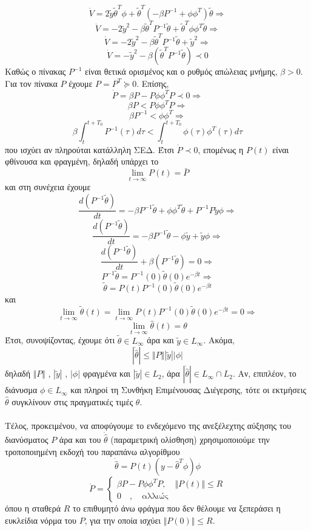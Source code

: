 \documentclass[12pt]{article}
\begin{document}
\[ \dot{V}= 2\tilde{y}\tilde{\theta}^{T}\phi + \tilde{\theta}^{T} \left(  -\beta P^{-1}+\phi \phi^{T} \right)\tilde{\theta} \Rightarrow \]
\[ \dot{V}=- 2\tilde{y}^2 -\beta \tilde{\theta}^{T}P^{-1}\tilde{\theta}+\tilde{\theta}^{T}\phi \phi^{T}\tilde{\theta} \Rightarrow \]
\[ \dot{V}=- 2\tilde{y}^2 -\beta \tilde{\theta}^{T}P^{-1}\tilde{\theta}+\tilde{y}^2\Rightarrow \]
\[ \dot{V}=- \tilde{y}^2 -\beta \left( \tilde{\theta}^{T}P^{-1}\tilde{\theta} \right) \prec 0\]
Καθώς ο πίνακας $P^{-1}$ είναι θετικά ορισμένος και ο ρυθμός απώλειας μνήμης, $\beta > 0$.
Για τον πίνακα $P$ έχουμε $P=P^T \succeq 0$.
Επίσης,
\[\dot{P}=\beta P - P \phi \phi^T P \prec 0 \Rightarrow\]
\[\beta P < P \phi \phi^T P \Rightarrow \]
\[ \beta P^{-1} <  \phi \phi^T \Rightarrow \]
\[\beta \int_{t}^{t+T_0} P^{-1}(\tau) d\tau < \int_{t}^{t+T_0} \phi(\tau) \phi^T(\tau) d\tau\]
που ισχύει αν πληρούται κατάλληλη ΣΕΔ. Έτσι $\dot{P} \prec 0$,
επομένως η $P(t)$ είναι φθίνουσα και φραγμένη, δηλαδή υπάρχει το 
\[\lim_{t \to \infty} P(t) = \bar{P}\]
και στη συνέχεια έχουμε
\[ \frac{d(P^{-1} \tilde{\theta})}{dt} = -\beta P^{-1}\tilde{\theta} + \phi \phi^{T}\tilde{\theta}+P^{-1}P\tilde{y}\phi \Rightarrow \]
\[\frac{d(P^{-1} \tilde{\theta})}{dt} = -\beta P^{-1}\tilde{\theta} -\phi\tilde{y} + \tilde{y}\phi \Rightarrow \]
\[\frac{d(P^{-1} \tilde{\theta})}{dt} + \beta \left( P^{-1}\tilde{\theta} \right) = 0 \Rightarrow \]
\[  P^{-1}\tilde{\theta} =P^{-1}(0)\tilde{\theta}(0) e^{-\beta t} \Rightarrow \]
\[  \tilde{\theta} =P(t)P^{-1}(0)\tilde{\theta}(0) e^{-\beta t}\]
και
\[ \lim_{t \to \infty} \tilde{\theta}(t) =\lim_{t \to \infty} P(t)P^{-1}(0)\tilde{\theta}(0) e^{-\beta t}=0 \Rightarrow\]
\[\lim_{t \to \infty} \hat{\theta}(t) = \theta \]
Έτσι, συνοψίζοντας, έχουμε ότι $\tilde{\theta} \in L_\infty$ άρα και $\tilde{y} \in L_\infty$. Ακόμα, 
\[ | \dot{\hat{\theta}} | \leq \Vert P \Vert |\tilde{y}| |\phi| \]
δηλαδή $\Vert P \Vert$ , $|\tilde{y}|$ , $|\phi|$ φραγμένα και $|\tilde{y}| \in L_2$, άρα $| \dot{\hat{\theta}} | \in L_{\infty} \cap L_2$. Αν, επιπλέον, το διάνυσμα $\phi \in L_{\infty}$ και πληροί τη Συνθήκη Επιμένουσας Διέγερσης, τότε οι εκτμήσεις $\hat{\theta}$ συγκλίνουν στις πραγματικές τιμές $\theta$.
\\ \\
Τέλος, προκειμένου, να αποφύγουμε το ενδεχόμενο της ανεξέλεχτης αύξησης του διανύσματος $P$ άρα και του $\dot{\hat{\theta}}$  (παραμετρική ολίσθηση) χρησιμοποιούμε την τροποποιημένη εκδοχή του παραπάνω αλγορίθμου
\[ \dot{\hat{\theta}}=P(t) \left( y - \hat{\theta}^{T}\phi \right)\phi \]
\[ \dot{P}=
\left\{
                \begin{array}{ll}
                 \beta P - P \phi \phi^T P ,\quad  \Vert P(t)\Vert \leq R   \\
                  0 \quad ,\quad \text{αλλιώς}             
                \end{array}
              \right. \] 
όπου η σταθερά $R$ το επιθυμητό άνω φράγμα που δεν θέλουμε να ξεπεράσει η ευκλείδια νόρμα του $P$, για την οποία ισχύει $ \Vert P(0) \Vert \leq R$.
\end{document}
